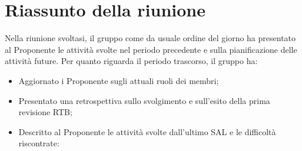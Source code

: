 \section{Riassunto della riunione}
Nella riunione svoltasi, il gruppo come da usuale ordine del giorno ha presentato al Proponente le attività svolte nel periodo precedente e sulla pianificazione delle attività future. 
Per quanto riguarda il periodo trascorso, il gruppo ha:
\begin{itemize}
    \item Aggiornato i Proponente sugli attuali ruoli dei membri;
    \item Presentato una retrospettiva sullo svolgimento e sull'esito della prima revisione RTB;
    \item Descritto al Proponente le attività svolte dall'ultimo SAL e le difficoltà riscontrate:
\end{itemize}

